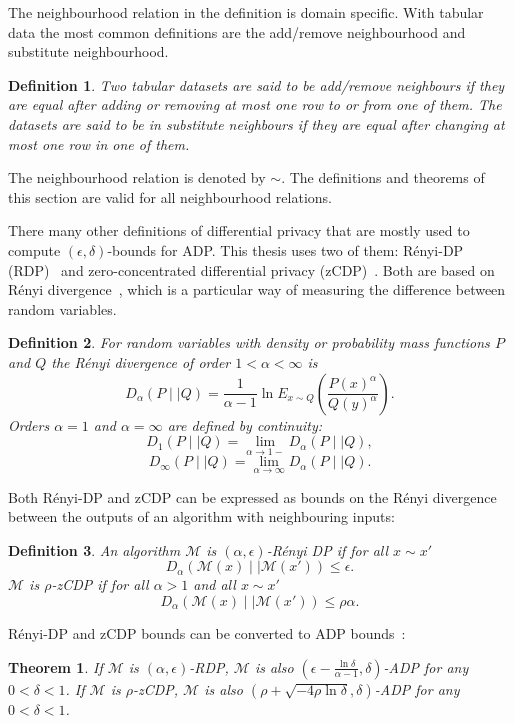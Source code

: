 \documentclass[english,twoside,openright]{HYgraduMLDS}
\newtheorem{theorem}{Theorem}
\newtheorem{definition}{Definition}
\newcommand{\dmid}{\mid\mid}
\newcommand{\calm}{{\mathcal{M}}}
\begin{document}
The neighbourhood relation in the definition is domain specific. With tabular 
data the most common definitions are the add/remove neighbourhood and 
substitute neighbourhood.
\begin{definition}
    Two tabular datasets are said to be add/remove neighbours if they are equal 
    after adding or removing at most one row to or from one of them. The datasets 
    are said to be in substitute neighbours if they are equal after 
    changing at most one row in one of them.
\end{definition}
The neighbourhood relation is denoted by \(\sim\). The definitions and 
theorems of this section are valid for all neighbourhood relations.

There many other definitions of differential privacy that are mostly used 
to compute \((\epsilon, \delta)\)-bounds for ADP. This thesis uses two of them: 
Rényi-DP (RDP)~\cite{Mironov17} and 
zero-concentrated differential privacy (zCDP)~\cite{BuS16}. Both are based 
on Rényi divergence~\cite{Mironov17}, which is a particular way of 
measuring the difference between random variables.

\begin{definition}
    For random variables with density or probability mass functions 
    \(P\) and \(Q\) the Rényi divergence of order 
    \(1 < \alpha < \infty\) is
    \[
        D_\alpha(P\dmid Q) = \frac{1}{\alpha - 1}\ln E_{x\sim Q}
        \left(\frac{P(x)^\alpha}{Q(y)^\alpha}\right).
    \]
    Orders \(\alpha = 1\) and \(\alpha = \infty\) are defined 
    by continuity:
    \[
        D_1(P\dmid Q) = \lim_{\alpha \to 1-} D_\alpha(P\dmid Q),
    \]
    \[
        D_\infty(P \dmid Q) = \lim_{\alpha\to \infty}D_\alpha(P\dmid Q).
    \]
\end{definition}

Both Rényi-DP and zCDP can be expressed as bounds on the 
Rényi divergence between the outputs of an algorithm with 
neighbouring inputs:

\begin{definition}
    An algorithm \(\calm\) is \((\alpha, \epsilon)\)-Rényi DP 
    if for all \(x \sim x'\)
    \[
        D_\alpha(\calm(x)\dmid \calm(x')) \leq \epsilon.
    \]
    \(\calm\) is \(\rho\)-zCDP if for all \(\alpha > 1\)
    and all \(x \sim x'\)
    \[
        D_\alpha(\calm(x)\dmid \calm(x')) \leq \rho \alpha.
    \]

\end{definition}

Rényi-DP and zCDP bounds can be converted to ADP bounds~\cite{Mironov17, BuS16}:
\begin{theorem}\label{other_dp_to_adp}
    If \(\calm\) is \((\alpha, \epsilon)\)-RDP, \(\calm\) is also 
    \((\epsilon - \frac{\ln \delta}{\alpha - 1}, \delta)\)-ADP for any 
    \(0 < \delta < 1\). If \(\calm\) is \(\rho\)-zCDP, \(\calm\) is also 
    \((\rho + \sqrt{-4\rho\ln \delta}, \delta)\)-ADP for any \(0 < \delta < 1\).
\end{theorem}
\end{document}
